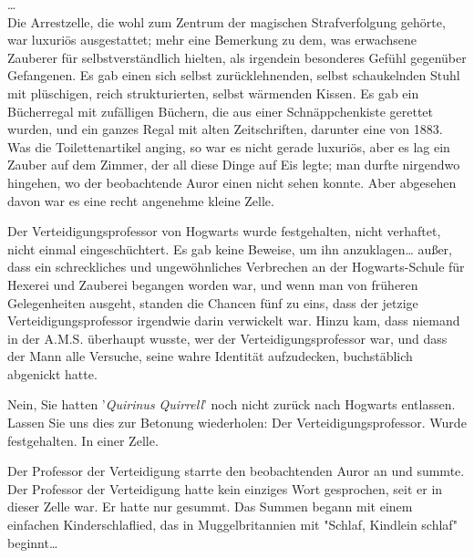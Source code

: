 {…\\ Die Arrestzelle, die wohl zum Zentrum der magischen Strafverfolgung gehörte, war luxuriös ausgestattet; mehr eine Bemerkung zu dem, was erwachsene Zauberer für selbstverständlich hielten, als irgendein besonderes Gefühl gegenüber Gefangenen. Es gab einen sich selbst zurücklehnenden, selbst schaukelnden Stuhl mit plüschigen, reich strukturierten, selbst wärmenden Kissen. Es gab ein Bücherregal mit zufälligen Büchern, die aus einer Schnäppchenkiste gerettet wurden, und ein ganzes Regal mit alten Zeitschriften, darunter eine von 1883. Was die Toilettenartikel anging, so war es nicht gerade luxuriös, aber es lag ein Zauber auf dem Zimmer, der all diese Dinge auf Eis legte; man durfte nirgendwo hingehen, wo der beobachtende Auror einen nicht sehen konnte. Aber abgesehen davon war es eine recht angenehme kleine Zelle.

Der Verteidigungsprofessor von Hogwarts wurde festgehalten, nicht verhaftet, nicht einmal eingeschüchtert. Es gab keine Beweise, um ihn anzuklagen… außer, dass ein schreckliches und ungewöhnliches Verbrechen an der Hogwarts-Schule für Hexerei und Zauberei begangen worden war, und wenn man von früheren Gelegenheiten ausgeht, standen die Chancen fünf zu eins, dass der jetzige Verteidigungsprofessor irgendwie darin verwickelt war. Hinzu kam, dass niemand in der A.M.S. überhaupt wusste, wer der Verteidigungsprofessor war, und dass der Mann alle Versuche, seine wahre Identität aufzudecken, buchstäblich abgenickt hatte.

Nein, Sie hatten '\emph{Quirinus Quirrell}' noch nicht zurück nach Hogwarts entlassen. Lassen Sie uns dies zur Betonung wiederholen: Der Verteidigungsprofessor. Wurde festgehalten. In einer Zelle.

Der Professor der Verteidigung starrte den beobachtenden Auror an und summte.\\ Der Professor der Verteidigung hatte kein einziges Wort gesprochen, seit er in dieser Zelle war. Er hatte nur gesummt. Das Summen begann mit einem einfachen Kinderschlaflied, das in Muggelbritannien mit "Schlaf, Kindlein schlaf" beginnt…

}
